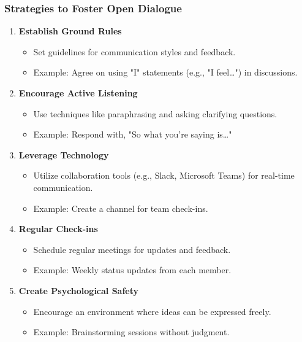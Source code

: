 \documentclass[aspectratio=169]{beamer}
\begin{document}
\begin{frame}[fragile]
    \frametitle{Strategies to Foster Open Dialogue}

    \begin{enumerate}
        \item \textbf{Establish Ground Rules}
            \begin{itemize}
                \item Set guidelines for communication styles and feedback.
                \item Example: Agree on using "I" statements (e.g., "I feel…") in discussions.
            \end{itemize}
        
        \item \textbf{Encourage Active Listening}
            \begin{itemize}
                \item Use techniques like paraphrasing and asking clarifying questions.
                \item Example: Respond with, "So what you're saying is…"
            \end{itemize}
        
        \item \textbf{Leverage Technology}
            \begin{itemize}
                \item Utilize collaboration tools (e.g., Slack, Microsoft Teams) for real-time communication.
                \item Example: Create a channel for team check-ins.
            \end{itemize}
        
        \item \textbf{Regular Check-ins}
            \begin{itemize}
                \item Schedule regular meetings for updates and feedback.
                \item Example: Weekly status updates from each member.
            \end{itemize}
        
        \item \textbf{Create Psychological Safety}
            \begin{itemize}
                \item Encourage an environment where ideas can be expressed freely.
                \item Example: Brainstorming sessions without judgment.
            \end{itemize}
        

\end{enumerate}
\end{frame}
\end{document}
